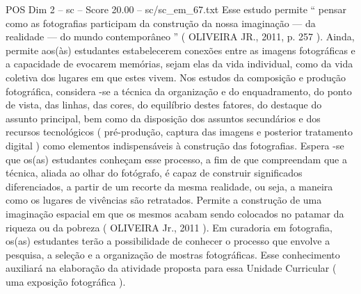 \begin{textsample}{POS Dim 2 – sc – Score 20.00 – sc/sc\_em\_67.txt}
Esse estudo permite “ pensar como as fotografias participam da construção da nossa imaginação — da realidade — do mundo contemporâneo ” ( OLIVEIRA JR., 2011, p. 257 ).
Ainda, permite aos(às) estudantes estabelecerem conexões entre as imagens fotográficas e a capacidade de evocarem memórias, sejam elas da vida individual, como da vida coletiva dos lugares em que estes vivem.
Nos estudos da composição e produção fotográfica, considera -se a técnica da organização e do enquadramento, do ponto de vista, das linhas, das cores, do equilíbrio destes fatores, do destaque do assunto principal, bem como da disposição dos assuntos secundários e dos recursos tecnológicos ( pré-produção, captura das imagens e posterior tratamento digital ) como elementos indispensáveis à construção das fotografias.
Espera -se que os(as) estudantes conheçam esse processo, a fim de que compreendam que a técnica, aliada ao olhar do fotógrafo, é capaz de construir significados diferenciados, a partir de um recorte da mesma realidade, ou seja, a maneira como os lugares de vivências são retratados.
Permite a construção de uma imaginação espacial em que os mesmos acabam sendo colocados no patamar da riqueza ou da pobreza ( OLIVEIRA Jr., 2011 ).
Em curadoria em fotografia, os(as) estudantes terão a possibilidade de conhecer o processo que envolve a pesquisa, a seleção e a organização de mostras fotográficas.
Esse conhecimento auxiliará na elaboração da atividade proposta para essa Unidade Curricular ( uma exposição fotográfica ).

\end{textsample}

